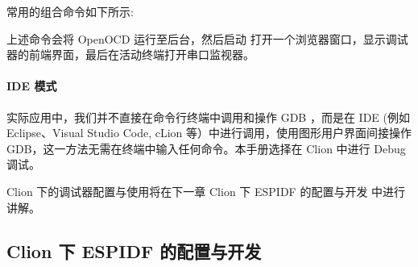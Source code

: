 \documentclass[a4paper,12pt,english]{sphinxmanual}
\begin{document}
\begin{enumerate}
\sphinxAtStartPar
常用的组合命令如下所示:

\begin{sphinxVerbatim}[commandchars=\\\{\}]
   
\end{sphinxVerbatim}

\sphinxAtStartPar
上述命令会将 OpenOCD 运行至后台，然后启动  打开一个浏览器窗口，显示调试器的前端界面，最后在活动终端打开串口监视器。

\end{enumerate}


\paragraph{IDE 模式}
\label{\detokenize{exp-esp32/ide/esp-idf-cli-debug:ide}}
\sphinxAtStartPar
实际应用中，我们并不直接在命令行终端中调用和操作 GDB ，而是在 IDE (例如 Eclipse、Visual Studio Code, cLion 等）中进行调用，使用图形用户界面间接操作 GDB，这一方法无需在终端中输入任何命令。本手册选择在 Clion 中进行 Debug 调试。

\sphinxAtStartPar
Clion 下的调试器配置与使用将在下一章 Clion 下 ESP\sphinxhyphen{}IDF 的配置与开发 中进行讲解。

\sphinxstepscope


\subsection{Clion 下 ESP\sphinxhyphen{}IDF 的配置与开发}
\label{\detokenize{exp-esp32/ide/esp-idf-clion-dev:clion-esp-idf}}\label{\detokenize{exp-esp32/ide/esp-idf-clion-dev::doc}}
\end{document}
